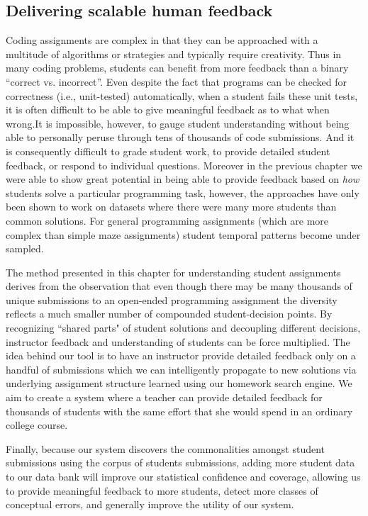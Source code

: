 \subsection{Delivering scalable human feedback}

Coding assignments are complex in that they can 
be approached with a multitude of algorithms or strategies and typically require creativity. 
Thus in many coding problems, students can benefit from more feedback than a binary ``correct vs. incorrect''. Even despite the fact that programs can be checked for correctness (i.e., unit-tested) automatically, when a student fails these unit tests, it is often difficult to be able to give meaningful feedback as to what when wrong.It is impossible, however, to gauge student understanding without being able to personally peruse through  tens of thousands of code submissions.
And it is consequently difficult to grade student work, to provide detailed student feedback, or respond to individual questions. Moreover in the previous chapter we were able to show great potential in being able to provide feedback based on \emph{how} students solve a particular programming task, however, the approaches have only been shown to work on datasets where there were many more students than common solutions. For general programming assignments (which are more complex than simple maze assignments) student temporal patterns become under sampled. 

The method presented in this chapter for understanding student assignments derives from the observation that even though there may be many thousands of unique submissions to an open-ended programming assignment the diversity reflects a much smaller number of compounded student-decision points. By recognizing ``shared parts" of student solutions and decoupling different decisions, instructor feedback and understanding of students can be force multiplied. The idea behind our tool is to have an instructor provide detailed feedback only on a handful of submissions which we can intelligently propagate to new solutions via underlying assignment structure learned using our homework search engine. We aim to create a system where a teacher can provide detailed 
feedback for thousands of students with the same effort that she would spend in an ordinary college course.


 Finally, because our system discovers the commonalities amongst student submissions using the corpus of students submissions, adding more student data to our data bank
 will improve our statistical confidence and coverage, 
 allowing us to provide meaningful feedback to more students, detect more classes of conceptual errors, and generally improve the utility of our system.

